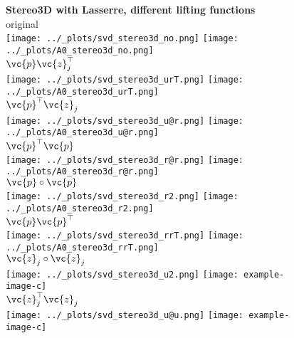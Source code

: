 \begin{figure}[h]
  \centering
  \textbf{\large{Stereo3D with Lasserre, different lifting functions}}\\
  original \\
  \texttt{[image: ../\_plots/svd\_stereo3d\_no.png]}
  \texttt{[image: ../\_plots/A0\_stereo3d\_no.png]} \\
  $\vc{p}\vc{z}_j^\top$ \\
  \texttt{[image: ../\_plots/svd\_stereo3d\_urT.png]}
  \texttt{[image: ../\_plots/A0\_stereo3d\_urT.png]} \\
  $\vc{p}^\top\vc{z}_j$ \\
  \texttt{[image: ../\_plots/svd\_stereo3d\_u@r.png]}
  \texttt{[image: ../\_plots/A0\_stereo3d\_u@r.png]} \\
  $\vc{p}^\top\vc{p}$ \\
  \texttt{[image: ../\_plots/svd\_stereo3d\_r@r.png]}
  \texttt{[image: ../\_plots/A0\_stereo3d\_r@r.png]} \\
  $\vc{p}\circ\vc{p}$ \\
  \texttt{[image: ../\_plots/svd\_stereo3d\_r2.png]}
  \texttt{[image: ../\_plots/A0\_stereo3d\_r2.png]}  \\
  $\vc{p}\vc{p}^\top$ \\
  \texttt{[image: ../\_plots/svd\_stereo3d\_rrT.png]}
  \texttt{[image: ../\_plots/A0\_stereo3d\_rrT.png]}  \\
  $\vc{z}_j\circ\vc{z}_j$ \\
  \texttt{[image: ../\_plots/svd\_stereo3d\_u2.png]} 
  \texttt{[image: example-image-c]}  \\
  $\vc{z}_j^\top\vc{z}_j$ \\
  \texttt{[image: ../\_plots/svd\_stereo3d\_u@u.png]}
  \texttt{[image: example-image-c]}  \\
\end{figure}

